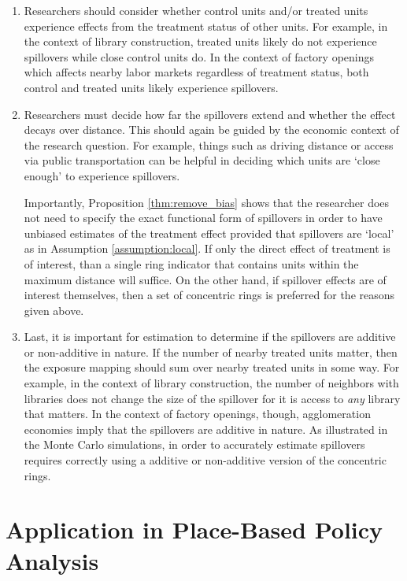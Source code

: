 \documentclass[11pt]{article}
\begin{document}
\begin{enumerate}
    \item Researchers should consider whether control units and/or treated units experience effects from the treatment status of other units. For example, in the context of library construction, treated units likely do not experience spillovers while close control units do. In the context of factory openings which affects nearby labor markets regardless of treatment status, both control and treated units likely experience spillovers. 
    
    \item Researchers must decide how far the spillovers extend and whether the effect decays over distance. This should again be guided by the economic context of the research question. For example, things such as driving distance or access via public transportation can be helpful in deciding which units are `close enough' to experience spillovers. 

    Importantly, Proposition \ref{thm:remove_bias} shows that the researcher does not need to specify the exact functional form of spillovers in order to have unbiased estimates of the treatment effect provided that spillovers are `local' as in Assumption \ref{assumption:local}. If only the direct effect of treatment is of interest, than a single ring indicator that contains units within the maximum distance will suffice. On the other hand, if spillover effects are of interest themselves, then a set of concentric rings is preferred for the reasons given above. 

    \item Last, it is important for estimation to determine if the spillovers are additive or non-additive in nature. If the number of nearby treated units matter, then the exposure mapping should sum over nearby treated units in some way. For example, in the context of library construction, the number of neighbors with libraries does not change the size of the spillover for it is access to \textit{any} library that matters. In the context of factory openings, though, agglomeration economies imply that the spillovers are additive in nature. As illustrated in the Monte Carlo simulations, in order to accurately estimate spillovers requires correctly using a additive or non-additive version of the concentric rings. 
\end{enumerate}

\section{Application in Place-Based Policy Analysis}
\label{sec:tva}
\end{document}
